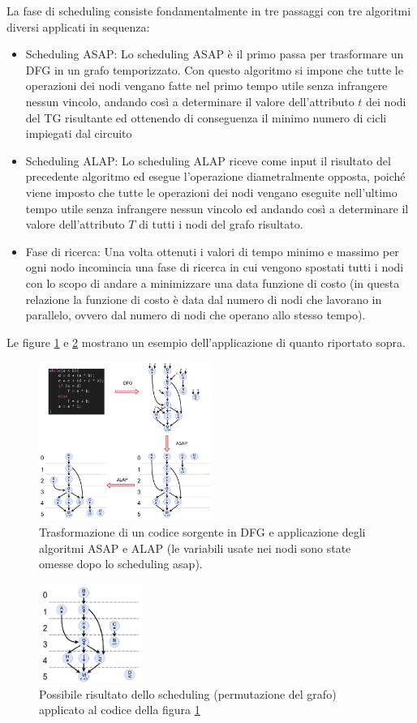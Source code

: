 \documentclass[]{IEEEtran}
\begin{document}
La fase di scheduling consiste fondamentalmente in tre passaggi con tre algoritmi diversi applicati in sequenza:
\begin{itemize}
	\item  Scheduling ASAP: Lo scheduling ASAP è il primo passa per trasformare un DFG in un grafo temporizzato. Con questo algoritmo si impone che tutte le operazioni dei nodi vengano fatte nel primo tempo utile senza infrangere nessun vincolo, andando così a determinare il valore dell'attributo $t$ dei nodi del TG risultante ed ottenendo di conseguenza il minimo numero di cicli impiegati dal circuito 
	\item Scheduling ALAP: Lo scheduling ALAP riceve come input il risultato del precedente algoritmo ed esegue l'operazione diametralmente opposta, poiché viene imposto che tutte le operazioni dei nodi vengano eseguite nell'ultimo tempo utile senza infrangere nessun vincolo ed andando così a determinare il valore dell'attributo $T$ di tutti i nodi del grafo risultato.
	\item Fase di ricerca: Una volta ottenuti i valori di tempo minimo e massimo per ogni nodo incomincia una fase di ricerca in cui vengono spostati tutti i nodi con lo scopo di andare a minimizzare una data funzione di costo (in questa relazione la funzione di costo è data dal numero di nodi che lavorano in parallelo, ovvero dal numero di nodi che operano allo stesso tempo).
\end{itemize}
Le figure \ref{scheduling} e \ref{scheduling2} mostrano un esempio dell'applicazione di quanto riportato sopra.
\begin{figure}[htp]
	\centering
	\includegraphics[width=0.5\textwidth]{images/schedule.png}
	\caption{Trasformazione di un codice sorgente in DFG e applicazione degli algoritmi ASAP e ALAP (le variabili usate nei nodi sono state omesse dopo lo scheduling asap).}
	\label{scheduling}
\end{figure}
\begin{figure}[htp]
	\centering
	\includegraphics[width=0.3\textwidth]{images/scheduling2.png}
	\caption{Possibile risultato  dello scheduling (permutazione del grafo) applicato al codice della figura \ref{scheduling}}
	\label{scheduling2}
\end{figure}
\end{document}
